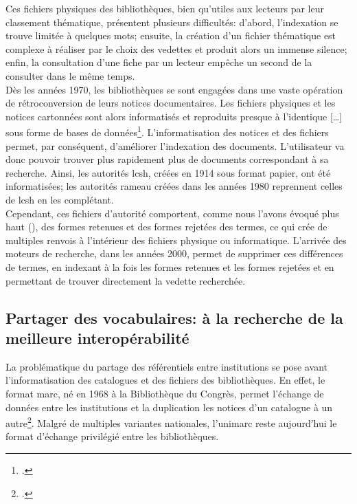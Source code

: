 Ces fichiers physiques des bibliothèques, bien qu'utiles aux lecteurs par leur classement thématique, présentent plusieurs difficultés: d'abord, l'indexation se trouve limitée à quelques mots; ensuite, la création d'un fichier thématique est complexe à réaliser par le choix des vedettes et produit alors un immense silence; enfin, la consultation d'une fiche par un lecteur empêche un second de la consulter dans le même temps.\\

Dès les années 1970, les bibliothèques se sont engagées dans une vaste opération de rétroconversion de leurs notices documentaires. Les fichiers physiques et les notices cartonnées sont alors informatisés et \og reproduits presque à l’identique [\dots] sous forme de bases de données\fg{}\footcite{bermes_du_2013}. L'informatisation des notices et des fichiers permet, par conséquent, d'améliorer l'indexation des documents. L'utilisateur va donc pouvoir trouver plus rapidement plus de documents correspondant à sa recherche. Ainsi, les autorités \ac{lcsh}, créées en 1914 sous format papier, ont été informatisées; les autorités \ac{rameau} créées dans les années 1980 reprennent celles de \ac{lcsh} en les complétant.\\

Cependant, ces fichiers d'autorité comportent, comme nous l'avons évoqué plus haut (), des formes retenues et des formes rejetées des termes, ce qui crée de multiples renvois à l'intérieur des fichiers physique ou informatique. L'arrivée des moteurs de recherche, dans les années 2000, permet de supprimer ces différences de termes, en indexant à la fois les formes retenues et les formes rejetées et en permettant de trouver directement la vedette recherchée.

\subsection{\label{I-A-3-b}Partager des vocabulaires: à la recherche de la meilleure interopérabilité}

La problématique du partage des référentiels entre institutions se pose avant l'informatisation des catalogues et des fichiers des bibliothèques. En effet, le format \ac{marc}, né en 1968 à la Bibliothèque du Congrès, permet l'échange de données entre les institutions et la \og duplication les notices d’un catalogue à un autre\fg{}\footcite{bermes_convergence_2013}. Malgré de multiples variantes nationales, l'\ac{unimarc} reste aujourd'hui le format d'échange privilégié entre les bibliothèques.\\

